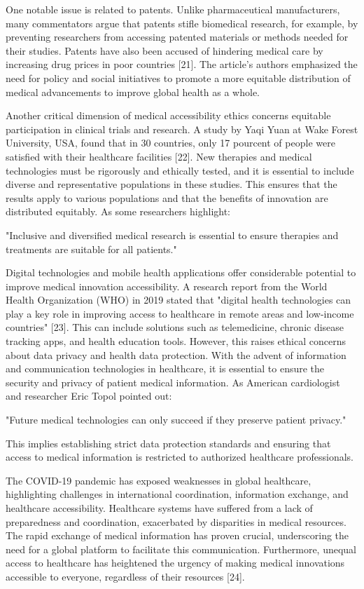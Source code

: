 One notable issue is related to patents. Unlike pharmaceutical manufacturers, many commentators argue that patents stifle biomedical research, for example, by preventing researchers from accessing patented materials or methods needed for their studies. Patents have also been accused of hindering medical care by increasing drug prices in poor countries [21]. The article's authors emphasized the need for policy and social initiatives to promote a more equitable distribution of medical advancements to improve global health as a whole.

Another critical dimension of medical accessibility ethics concerns equitable participation in clinical trials and research. A study by Yaqi Yuan at Wake Forest University, USA, found that in 30 countries, only 17 pourcent of people were satisfied with their healthcare facilities [22]. New therapies and medical technologies must be rigorously and ethically tested, and it is essential to include diverse and representative populations in these studies. This ensures that the results apply to various populations and that the benefits of innovation are distributed equitably. As some researchers highlight:

"Inclusive and diversified medical research is essential to ensure therapies and treatments are suitable for all patients."

Digital technologies and mobile health applications offer considerable potential to improve medical innovation accessibility. A research report from the World Health Organization (WHO) in 2019 stated that "digital health technologies can play a key role in improving access to healthcare in remote areas and low-income countries" [23]. This can include solutions such as telemedicine, chronic disease tracking apps, and health education tools. However, this raises ethical concerns about data privacy and health data protection. With the advent of information and communication technologies in healthcare, it is essential to ensure the security and privacy of patient medical information. As American cardiologist and researcher Eric Topol pointed out:

"Future medical technologies can only succeed if they preserve patient privacy."

This implies establishing strict data protection standards and ensuring that access to medical information is restricted to authorized healthcare professionals.

The COVID-19 pandemic has exposed weaknesses in global healthcare, highlighting challenges in international coordination, information exchange, and healthcare accessibility. Healthcare systems have suffered from a lack of preparedness and coordination, exacerbated by disparities in medical resources. The rapid exchange of medical information has proven crucial, underscoring the need for a global platform to facilitate this communication. Furthermore, unequal access to healthcare has heightened the urgency of making medical innovations accessible to everyone, regardless of their resources [24].

